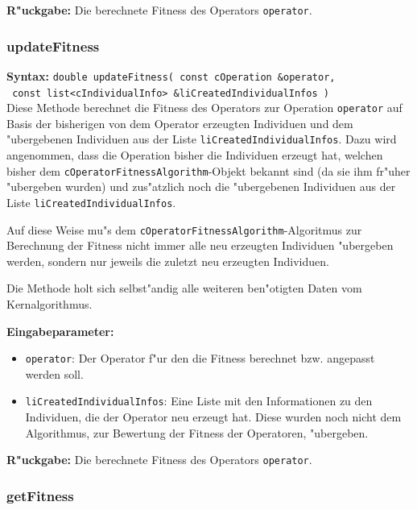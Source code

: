 \bigskip\noindent
\textbf{R"uckgabe:} Die berechnete Fitness des Operators \verb|operator|.


\subsubsection{updateFitness}

\textbf{Syntax:} \verb|double updateFitness( const cOperation &operator,| \\\verb| const list<cIndividualInfo> &liCreatedIndividualInfos )| \\

Diese Methode berechnet die Fitness des Operators zur Operation \verb|operator| auf Basis der bisherigen von dem Operator erzeugten Individuen und dem "ubergebenen Individuen aus der Liste \verb|liCreatedIndividualInfos|. Dazu wird angenommen, dass die Operation bisher die Individuen erzeugt hat, welchen bisher dem \verb|cOperatorFitnessAlgorithm|-Objekt bekannt sind (da sie ihm fr"uher "ubergeben wurden) und zus"atzlich noch die "ubergebenen Individuen aus der Liste \verb|liCreatedIndividualInfos|.

Auf diese Weise mu"s dem \verb|cOperatorFitnessAlgorithm|-Algoritmus zur Berechnung der Fitness nicht immer alle neu erzeugten Individuen "ubergeben werden, sondern nur jeweils die zuletzt neu erzeugten Individuen.

Die Methode holt sich selbst"andig alle weiteren ben"otigten Daten vom Kernalgorithmus.

\bigskip\noindent
\textbf{Eingabeparameter:}
\begin{itemize}
 \item \verb|operator|: Der Operator f"ur den die Fitness berechnet bzw. angepasst werden soll.
 \item \verb|liCreatedIndividualInfos|: Eine Liste mit den Informationen zu den Individuen, die der Operator neu erzeugt hat. Diese wurden noch nicht dem Algorithmus, zur Bewertung der Fitness der Operatoren, "ubergeben.
\end{itemize}

\bigskip\noindent
\textbf{R"uckgabe:} Die berechnete Fitness des Operators \verb|operator|.


\subsubsection{getFitness}


